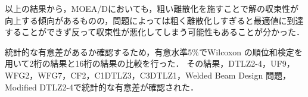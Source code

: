 \documentclass[../main/main]{subfiles}
\begin{document}
以上の結果から，MOEA/Dにおいても，粗い離散化を施すことで解の収束性が向上する傾向があるものの，問題によっては粗く離散化しすぎると最適値に到達することができず反って収束性が悪化してしまう可能性もあることが分かった．

統計的な有意差があるか確認するため，有意水準5\%でWilcoxon の順位和検定を用いて2桁の結果と16桁の結果の比較を行った．
その結果，DTLZ2-4，UF9，WFG2，WFG7，CF2，C1DTLZ3，C3DTLZ1，Welded Beam Design 問題，Modified DTLZ2-4で統計的な有意差が確認された．


\end{document}
